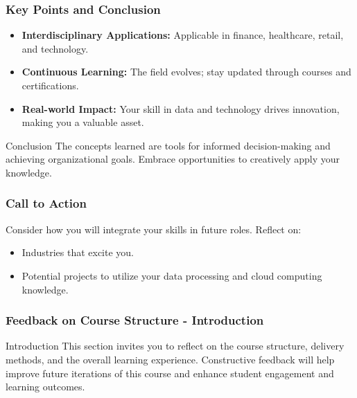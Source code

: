 \documentclass[aspectratio=169]{beamer}
\begin{document}
\begin{frame}[fragile]
    \frametitle{Key Points and Conclusion}
    \begin{itemize}
        \item \textbf{Interdisciplinary Applications:} Applicable in finance, healthcare, retail, and technology.
        \item \textbf{Continuous Learning:} The field evolves; stay updated through courses and certifications.
        \item \textbf{Real-world Impact:} Your skill in data and technology drives innovation, making you a valuable asset.
    \end{itemize}
    \begin{block}{Conclusion}
        The concepts learned are tools for informed decision-making and achieving organizational goals. Embrace opportunities to creatively apply your knowledge.
    \end{block}
\end{frame}

\begin{frame}[fragile]
    \frametitle{Call to Action}
    Consider how you will integrate your skills in future roles. Reflect on:
    \begin{itemize}
        \item Industries that excite you.
        \item Potential projects to utilize your data processing and cloud computing knowledge.
    \end{itemize}
\end{frame}

\begin{frame}[fragile]
    \frametitle{Feedback on Course Structure - Introduction}
    \begin{block}{Introduction}
        This section invites you to reflect on the course structure, delivery methods, and the overall learning experience. Constructive feedback will help improve future iterations of this course and enhance student engagement and learning outcomes.
    \end{block}
\end{frame}
\end{document}
